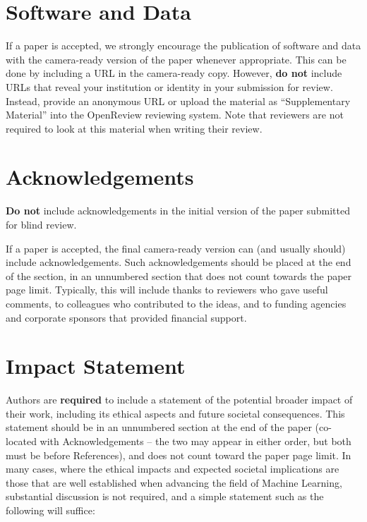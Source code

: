 \documentclass{article}
\theoremstyle{plain}
\theoremstyle{definition}
\theoremstyle{remark}
\begin{document}
\section*{Software and Data}

If a paper is accepted, we strongly encourage the publication of software and data with the
camera-ready version of the paper whenever appropriate. This can be
done by including a URL in the camera-ready copy. However, \textbf{do not}
include URLs that reveal your institution or identity in your
submission for review. Instead, provide an anonymous URL or upload
the material as ``Supplementary Material'' into the OpenReview reviewing
system. Note that reviewers are not required to look at this material
when writing their review.

\section*{Acknowledgements}

\textbf{Do not} include acknowledgements in the initial version of
the paper submitted for blind review.

If a paper is accepted, the final camera-ready version can (and
usually should) include acknowledgements.  Such acknowledgements
should be placed at the end of the section, in an unnumbered section
that does not count towards the paper page limit. Typically, this will 
include thanks to reviewers who gave useful comments, to colleagues 
who contributed to the ideas, and to funding agencies and corporate 
sponsors that provided financial support.

\section*{Impact Statement}

Authors are \textbf{required} to include a statement of the potential 
broader impact of their work, including its ethical aspects and future 
societal consequences. This statement should be in an unnumbered 
section at the end of the paper (co-located with Acknowledgements -- 
the two may appear in either order, but both must be before References), 
and does not count toward the paper page limit. In many cases, where 
the ethical impacts and expected societal implications are those that 
are well established when advancing the field of Machine Learning, 
substantial discussion is not required, and a simple statement such 
as the following will suffice:
\end{document}
